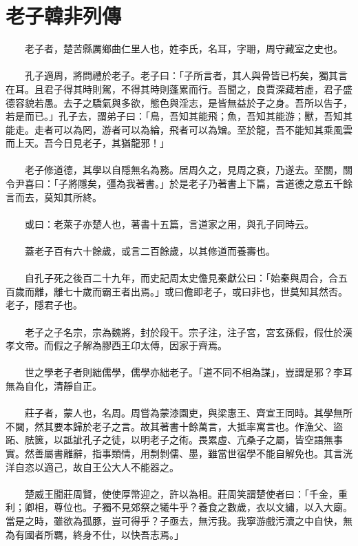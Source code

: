 
\section{老子韓非列傳}
　　老子者，楚苦縣厲鄉曲仁里人也，姓李氏，名耳，字耼，周守藏室之史也。
\\\\
　　孔子適周，將問禮於老子。老子曰：「子所言者，其人與骨皆已朽矣，獨其言在耳。且君子得其時則駕，不得其時則蓬累而行。吾聞之，良賈深藏若虛，君子盛德容貌若愚。去子之驕氣與多欲，態色與淫志，是皆無益於子之身。吾所以告子，若是而已。」孔子去，謂弟子曰：「鳥，吾知其能飛；魚，吾知其能游；獸，吾知其能走。走者可以為罔，游者可以為綸，飛者可以為矰。至於龍，吾不能知其乘風雲而上天。吾今日見老子，其猶龍邪！」
\\\\
　　老子修道德，其學以自隱無名為務。居周久之，見周之衰，乃遂去。至關，關令尹喜曰：「子將隱矣，彊為我著書。」於是老子乃著書上下篇，言道德之意五千餘言而去，莫知其所終。
\\\\
　　或曰：老萊子亦楚人也，著書十五篇，言道家之用，與孔子同時云。
\\\\
　　蓋老子百有六十餘歲，或言二百餘歲，以其修道而養壽也。
\\\\
　　自孔子死之後百二十九年，而史記周太史儋見秦獻公曰：「始秦與周合，合五百歲而離，離七十歲而霸王者出焉。」或曰儋即老子，或曰非也，世莫知其然否。老子，隱君子也。
\\\\
　　老子之子名宗，宗為魏將，封於段干。宗子注，注子宮，宮玄孫假，假仕於漢孝文帝。而假之子解為膠西王卬太傅，因家于齊焉。
\\\\
　　世之學老子者則絀儒學，儒學亦絀老子。「道不同不相為謀」，豈謂是邪？李耳無為自化，清靜自正。
\\\\
　　莊子者，蒙人也，名周。周嘗為蒙漆園吏，與梁惠王、齊宣王同時。其學無所不闚，然其要本歸於老子之言。故其著書十餘萬言，大抵率寓言也。作漁父、盜跖、胠篋，以詆訿孔子之徒，以明老子之術。畏累虛、亢桑子之屬，皆空語無事實。然善屬書離辭，指事類情，用剽剝儒、墨，雖當世宿學不能自解免也。其言洸洋自恣以適己，故自王公大人不能器之。
\\\\
　　楚威王聞莊周賢，使使厚幣迎之，許以為相。莊周笑謂楚使者曰：「千金，重利；卿相，尊位也。子獨不見郊祭之犧牛乎？養食之數歲，衣以文繡，以入大廟。當是之時，雖欲為孤豚，豈可得乎？子亟去，無污我。我寧游戲污瀆之中自快，無為有國者所羈，終身不仕，以快吾志焉。」
